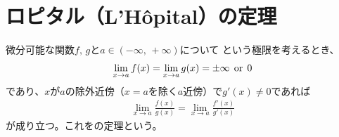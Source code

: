 \newpage
\section{ロピタル（L'H\^{o}pital）の定理}

微分可能な関数$f,\,g$と$a\in (-\infty,\,+\infty)$について
という極限を考えるとき、
\begin{gather}
  \lim_{x\to a} f(x) = \lim_{x\to a} g(x) = \pm \infty \:\:\rm{or}\:\:0
\end{gather}
であり、$x$が$a$の除外近傍（$x=a$を除く$a$近傍）で$g'(x)\neq 0$であれば
\begin{gather}
  \lim_{x\to a}\frac{f(x)}{g(x)} = \lim_{x\to a}\frac{f'(x)}{g'(x)}
\end{gather}
が成り立つ。これを\lhopital の定理という。
